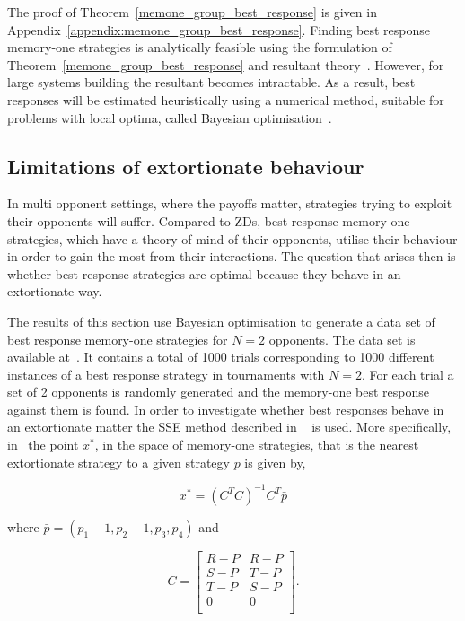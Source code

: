 \documentclass[10pt]{article}
\begin{document}
The proof of Theorem~\ref{memone_group_best_response} is given in
Appendix~\ref{appendix:memone_group_best_response}.
Finding best response memory-one strategies is analytically feasible using the
formulation of Theorem~\ref{memone_group_best_response} and resultant
theory~\cite{Jonsson2005}. However, for large systems building the resultant
becomes intractable. As a result, best responses will be estimated
heuristically using a numerical method, suitable for problems with local optima,
called Bayesian optimisation~\cite{Mokus1978}.

\subsection{Limitations of extortionate behaviour} %

In multi opponent settings,
where the payoffs matter, strategies trying to exploit their opponents will
suffer.
Compared to ZDs, best response memory-one strategies, which have a
theory of mind of their opponents, utilise their behaviour in order to gain the
most from their interactions. The question that arises then is whether best
response strategies are optimal because they behave in an extortionate way.

The results of this section use Bayesian optimisation to generate a data set of best response
memory-one strategies for \(N=2\) opponents.
The data set is available at~\cite{glynatsi2019}. It contains a total of 1000 trials
corresponding to 1000 different instances of a best response strategy in
tournaments with \(N=2\). For each trial a set of 2 opponents is
randomly generated and the memory-one best response against them is found.
In order to investigate whether best responses
behave in an extortionate matter the SSE method described in ~\cite{Knight2019} is used. More
specifically,
in~\cite{Knight2019} the point \(x^*\), in the space of memory-one strategies,
that is
the nearest extortionate strategy to a given strategy \(p\) is
given by,

\begin{equation}\label{eqn:x_star_formula}
    x^* = {\left(C^{T}C\right)}^{-1}C^{T}\bar{p}
\end{equation}

where \(\bar{p}=(p_1 - 1, p_2 - 1, p_3, p_4)\) and

\begin{equation}\label{eq:definition_of_C}
    C =
    \begin{bmatrix}
        R - P & R- P \\
        S - P & T- P \\
        T - P & S- P \\
        0     & 0 \\
    \end{bmatrix}.
\end{equation}
\end{document}
